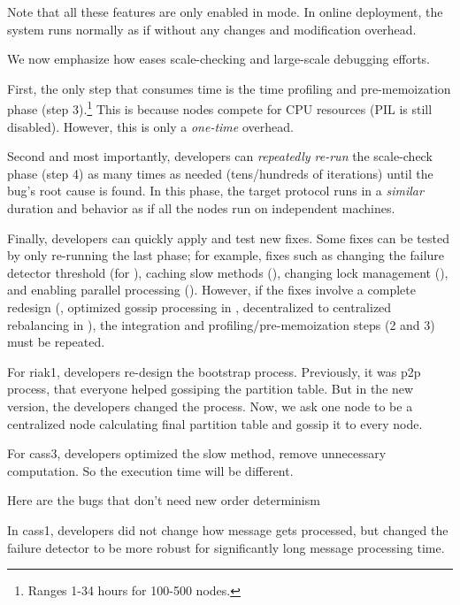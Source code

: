 Note that all these features are only enabled in \sck mode.  In online
deployment, the system runs normally as if without any changes and
modification overhead.


 We now emphasize how \sck eases
scale-checking and large-scale debugging efforts.  

First, the only step that consumes time is the time
profiling and pre-memoization phase (step 3).\footnote{Ranges
1-34 hours for 100-500 nodes.}  This is because nodes
compete for CPU resources (PIL is still disabled).  However, this is only
a {\em one-time} overhead.
%

Second and most importantly, developers can {\em repeatedly re-run} the
scale-check phase (step 4) as many times as needed (tens/hundreds of
iterations) until the bug's root cause is found.  In this phase, the
target protocol runs in a {\em similar} duration and behavior as if all
the nodes run on independent machines.

%
Finally, developers can quickly apply and test new fixes.
%
Some fixes can be tested by only re-running the last phase; for example,
fixes such as
%
changing the failure detector \phi threshold (for \caone),
%
caching slow methods (\catwo),
%
changing lock management (\cafour), and
%
enabling parallel processing (\voldone).
%
%
However, if the fixes involve a complete redesign (\eg, optimized gossip
processing in \catri, decentralized to centralized rebalancing in
\riakone), the integration and profiling/pre-memoization steps (2 and 3)
must be repeated.










For riak1, developers re-design the bootstrap process.  Previously, it was
p2p process, that everyone helped gossiping the partition table.  But in
the new version, the developers changed the process.  Now, we ask one node
to be a centralized node calculating final partition table and gossip it
to every node.

For cass3, developers optimized the slow method, remove unnecessary
computation.  So the execution time will be different.

Here are the bugs that don't need new order determinism

In cass1, developers did not change how message gets processed, but
changed the failure detector to be more robust for significantly long
message processing time.

